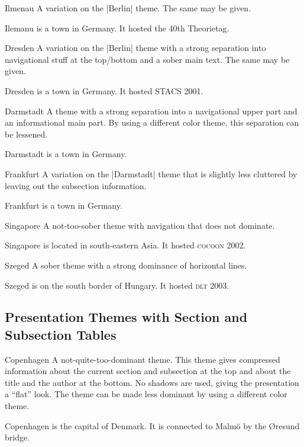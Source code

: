 \begin{themeexample}{Ilmenau}
  A variation on the |Berlin| theme. The same  may be given.

  Ilemanu is a town in Germany. It hosted the 40th Theorietag.
\end{themeexample}

\begin{themeexample}{Dresden}
  A variation on the |Berlin| theme with a strong separation into navigational stuff at the top/bottom and a sober main text. The same  may be given.

  Dresden is a town in Germany. It hosted STACS 2001.
\end{themeexample}


\begin{themeexample}{Darmstadt}
  A theme with a strong separation into a navigational upper part and an informational main part. By using a different color theme, this separation can be lessened.

  Darmstadt is a town in Germany.
\end{themeexample}

\begin{themeexample}{Frankfurt}
  A variation on the |Darmstadt| theme that is slightly less cluttered by leaving out the subsection information.

  Frankfurt is a town in Germany.
\end{themeexample}

\begin{themeexample}{Singapore}
  A not-too-sober theme with navigation that does not dominate.

  Singapore is located in south-eastern Asia. It hosted \textsc{cocoon} 2002.
\end{themeexample}

\begin{themeexample}{Szeged}
  A sober theme with a strong dominance of horizontal lines.

  Szeged is on the south border of Hungary. It hosted \textsc{dlt} 2003.
\end{themeexample}


\subsection{Presentation Themes with Section and Subsection Tables}

\begin{themeexample}{Copenhagen}
  A not-quite-too-dominant theme. This theme gives compressed information about the current section and subsection at the top and about the title and the author at the bottom. No shadows are used, giving the presentation a ``flat'' look. The theme can be made less dominant by using a different color theme.

  Copenhagen is the capital of Denmark. It is connected to Malm\"o by the \O resund bridge.
\end{themeexample}


